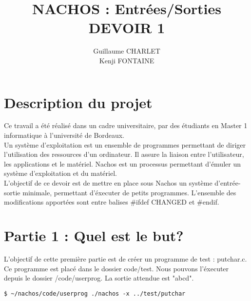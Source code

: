 \documentclass[a4paper]{article}
\title
{
	\LARGE{NACHOS : Entrées/Sorties}
	\HRule \\ [0.5cm]
	\LARGE \textbf{\uppercase{Devoir 1}}
	\HRule \\ [0.5cm]
}
\author{Guillaume CHARLET \\ Kenji FONTAINE}
\begin{document}
\null  %
\nointerlineskip  %
\vfill
\let\snewpage \newpage
\let\newpage \relax
\maketitle
\let \newpage \snewpage
\vfill
\break %


\tableofcontents
\newpage


\section{Description du projet}
Ce travail a été réalisé dans un cadre universitaire,  par des étudiants en
Master 1 informatique à l'université de Bordeaux. \\
Un système d'exploitation est un ensemble de programmes permettant de diriger
l'utilisation des ressources d'un ordinateur. Il assure la liaison entre
l'utilisateur, les applications et le matériel.
Nachos est un processus permettant d'émuler un système d'exploitation et du
matériel. \\
L'objectif de ce devoir est de mettre en place sous Nachos un système
d'entrée-sortie minimale, permettant d'éxecuter de petits programmes.
L'ensemble des modifications apportées sont entre balises \#ifdef CHANGED et
\#endif.


\section{Partie 1 : Quel est le but?}

L'objectif de cette première partie est de créer un programme de test : putchar.c.
Ce programme est placé dans le dossier code/test.
Nous pouvons l'éxecuter depuis le dossier /code/userprog. La sortie attendue est
"abcd".

\begin{verbatim}
$ ~/nachos/code/userprog ./nachos -x ../test/putchar
\end{verbatim}
\end{document}
